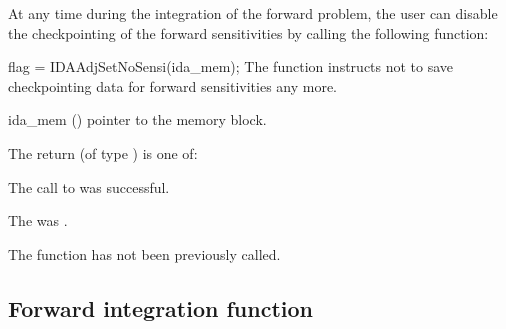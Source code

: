 At any time during the integration of the forward problem, the user
can disable the checkpointing of the forward sensitivities by calling
the following function:

{
  flag = IDAAdjSetNoSensi(ida\_mem);
}
{
  The function  instructs  not
  to save checkpointing data for forward sensitivities any more.
}
{
  \begin{args}
  \item[ida\_mem] ()
    pointer to the {\idas}  memory block.
  \end{args}
}
{
  The return  (of type ) is one of:
  \begin{args}
  \item[\Id{IDA\_SUCCESS}]
    The call to  was successful.
  \item[\Id{IDA\_MEM\_NULL}]
    The  was .
  \item[\Id{IDA\_NO\_ADJ}]
    The function  has not been previously called.
  \end{args}
}
{}


\subsection{Forward integration function}
\label{sss:idasolvef}

